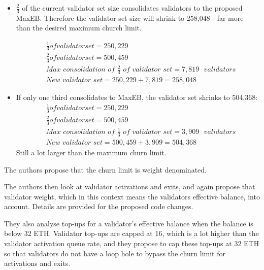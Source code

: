 \documentclass[UTF8]{article}
\begin{document}
\begin{itemize}
\item $\frac{2}{3}$ of the current validator set size consolidates validators to the proposed MaxEB. Therefore the validator set size will shrink to 258,048 - far more than the desired maximum church limit.

\begin{equation*}
\begin{split}
& \frac{1}{3} of validator set = 250,229\\
& \frac{2}{3} of validator set = 500,459\\
& \textit{Max consolidation of } \frac{2}{3} \textit{ of validator set} = 7,819 \texttt{ } validators \\
& \textit{New validator set} = 250,229 + 7,819 = 258,048
\end{split}
\end{equation*}

\item If only one third consolidates to MaxEB, the validator set shrinks to 504,368:
\begin{equation*}
\begin{split}
& \frac{1}{3} of validator set = 250,229\\
& \frac{2}{3} of validator set = 500,459\\
& \textit{Max consolidation of } \frac{1}{3} \textit{ of validator set} = 3,909 \texttt{ } validators \\
& \textit{New validator set} = 500,459 + 3,909 = 504,368
\end{split}
\end{equation*}
Still a lot larger than the maximum churn limit.

\end{itemize}
The authors propose that the churn limit is weight denominated. 


The authors then look at validator activations and exits, and again propose that validator weight, which in this context means the validators effective balance, into account. Details are provided for the proposed code changes.

They also analyse top-ups for a validator's effective balance when the balance is below 32 ETH. Validator top-ups are capped at 16, which is a lot higher than the validator activation queue rate, and they propose to cap these top-ups at 32 ETH so that validators do not have a loop hole to bypass the churn limit for activations and exits.
\end{document}
